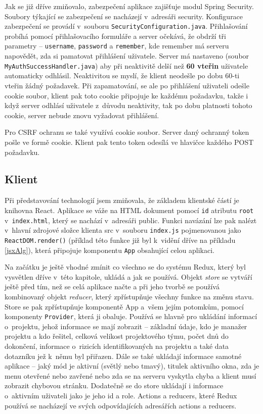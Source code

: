 Jak se již dříve zmiňovalo, zabezpečení aplikace zajišťuje modul Spring Security. Soubory týkající se zabezpečení se nacházejí v~adresáři security. Konfigurace zabezpečení se provádí v~souboru \texttt{SecurityConfiguration.java}. Přihlašování probíhá pomocí přihlašovacího formuláře a server očekává, že obdrží tři parametry – \texttt{username}, \texttt{password} a \texttt{remember}, kde remember má serveru napovědět, zda si pamatovat přihlášení uživatele. Server má nastaveno (soubor \texttt{MyAuthSuccessHandler.java}) aby při neaktivitě delší než \textbf{60 vteřin} uživatele automaticky odhlásil. Neaktivitou se myslí, že klient neodešle po dobu 60-ti vteřin žádný požadavek. Při zapamatování, se ale po přihlášení uživateli odešle cookie soubor, klient pak toto cookie připojuje ke každému požadavku, takže i když server odhlásí uživatele z~důvodu neaktivity, tak po dobu platnosti tohoto cookie, server nebude znovu vyžadovat přihlášení. 

Pro CSRF ochranu se také využívá cookie soubor. Server daný ochranný token pošle ve formě cookie. Klient pak tento token odesílá ve hlavičce každého POST požadavku.



\subsection{Klient}

Při představování technologií jsem zmiňovala, že základem klientské částí je knihovna React. Aplikace se váže na HTML dokument pomocí \texttt{id} atributu \texttt{root} v~\texttt{index.html}, který se nachází v~adresáři public. Funkci navázání lze pak nalézt v~hlavní zdrojové složce klienta src v~souboru \texttt{index.js} pojmenovanou jako \texttt{ReactDOM.render()} (příklad této funkce již byl k~vidění dříve na příkladu \ref{jsxAlg}), která připojuje komponentu \texttt{App} obsahující celou aplikaci.

Na začátku je ještě vhodné zmínit co všechno se do systému Redux, který byl vysvětlen dříve v~této kapitole, ukládá a jak se používá. Objekt \textit{store} se vytváří ještě před tím, než se celá aplikace načte a při jeho tvorbě se používá kombinovaný objekt \textit{reducer}, který zpřístupňuje všechny funkce na změnu stavu. Store se pak zpřístupňuje komponentě App a~všem jejím potomkům, pomocí komponenty \texttt{Provider}, která ji obaluje. Používá se hlavně pro ukládání informací o~projektu, jehož informace se mají zobrazit – základní údaje, kdo je manažer projektu a kdo řešitel, celková velikost projektového týmu, počet dnů do dokončení, informace o~rizicích identifikovaných na projektu a také data dotazníku jež k~němu byl přiřazen. Dále se také ukládají informace samotné aplikace – jaký mód je aktivní (světlý nebo tmavý), titulek aktivního okna, zda je menu otevřené nebo zavřené nebo zda se na serveru vyskytla chyba a klient musí zobrazit chybovou stránku. Dodatečně se do store ukládají i informace o~aktivním uživateli jako je jeho id a role. Actions a reducers, které Redux používá se nacházejí ve svých odpovídajících adresářích actions a reducers. 

